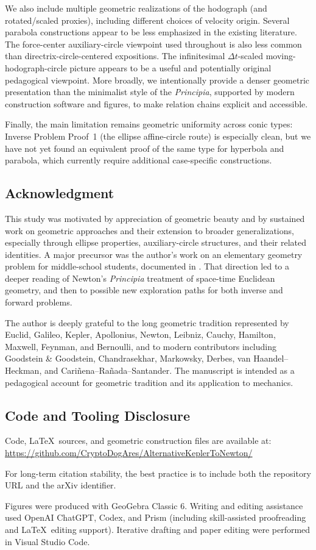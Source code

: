 We also include multiple geometric realizations of the hodograph (and rotated/scaled proxies), including different choices of velocity origin. Several parabola constructions appear to be less emphasized in the existing literature. The force-center auxiliary-circle viewpoint used throughout is also less common than directrix-circle-centered expositions. The infinitesimal \(\Delta t\)-scaled moving-hodograph-circle picture appears to be a useful and potentially original pedagogical viewpoint. More broadly, we intentionally provide a denser geometric presentation than the minimalist style of the \emph{Principia}, supported by modern construction software and figures, to make relation chains explicit and accessible.

Finally, the main limitation remains geometric uniformity across conic types: Inverse Problem Proof~1 (the ellipse affine-circle route) is especially clean, but we have not yet found an equivalent proof of the same type for hyperbola and parabola, which currently require additional case-specific constructions.

\subsection*{Acknowledgment}
This study was motivated by appreciation of geometric beauty and by sustained work on geometric approaches and their extension to broader generalizations, especially through ellipse properties, auxiliary-circle structures, and their related identities. A major precursor was the author's work on an elementary geometry problem for middle-school students, documented in \cite{cryptodogares2026geometrydegreefreedom}.
That direction led to a deeper reading of Newton's \emph{Principia} treatment of space-time Euclidean geometry, and then to possible new exploration paths for both inverse and forward problems.

The author is deeply grateful to the long geometric tradition represented by Euclid, Galileo, Kepler, Apollonius, Newton, Leibniz, Cauchy, Hamilton, Maxwell, Feynman, and Bernoulli, and to modern contributors including Goodstein \& Goodstein, Chandrasekhar, Markowsky, Derbes, van Haandel--Heckman, and Cari\~nena--Ra\~nada--Santander. The manuscript is intended as a pedagogical account for geometric tradition and its application to mechanics.

\subsection*{Code and Tooling Disclosure}
Code, \LaTeX\ sources, and geometric construction files are available at:
\url{https://github.com/CryptoDogAres/AlternativeKeplerToNewton/}

For long-term citation stability, the best practice is to include both the repository URL and the arXiv identifier.

Figures were produced with GeoGebra Classic 6. Writing and editing assistance used OpenAI ChatGPT, Codex, and Prism (including skill-assisted proofreading and \LaTeX\ editing support). Iterative drafting and paper editing were performed in Visual Studio Code.
